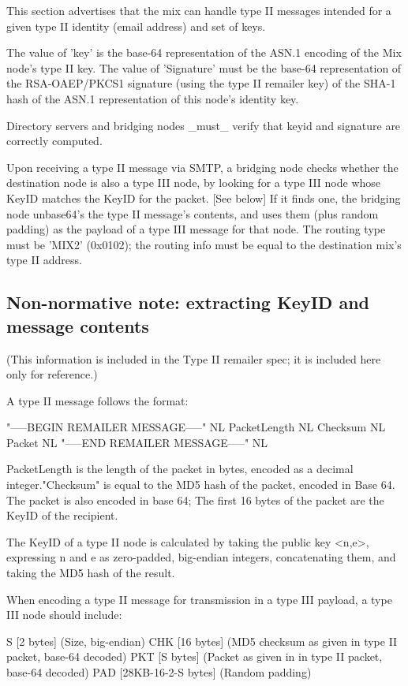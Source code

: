 This section advertises that the mix can handle type II messages
intended for a given type II identity (email address) and set of keys.

The value of 'key' is the base-64 representation of the ASN.1 encoding
of the Mix node's type II key. The value of 'Signature' must be the
base-64 representation of the RSA-OAEP/PKCS1 signature (using the
type II remailer key) of the SHA-1 hash of the ASN.1 representation of
this node's identity key.

Directory servers and bridging nodes _must_ verify that keyid and
signature are correctly computed.

Upon receiving a type II message via SMTP, a bridging node checks
whether the destination node is also a type III node, by looking for a
type III node whose KeyID matches the KeyID for the packet. [See below]
If it finds one, the bridging node unbase64's the type II message's 
contents, and uses them (plus random padding) as the payload
of a type III message for that node.  The routing type must be 'MIX2'
(0x0102); the routing info must be equal to the destination mix's
type II address.

\subsection{Non-normative note: extracting KeyID and message contents}

(This information is included in the Type II remailer spec; it is included
here only for reference.)

A type II message follows the format:

"-----BEGIN REMAILER MESSAGE-----" NL
PacketLength NL
Checksum NL
Packet NL
"-----END REMAILER MESSAGE-----" NL

PacketLength is the length of the packet in bytes, encoded as a
decimal integer."Checksum" is equal to the MD5 hash of the packet,
encoded in Base 64.  The packet is also encoded in base 64; The first
16 bytes of the packet are the KeyID of the recipient.

The KeyID of a type II node is calculated by taking the public key
<n,e>, expressing n and e as zero-padded, big-endian integers,
concatenating them, and taking the MD5 hash of the result.

When encoding a type II message for transmission in a type III payload,
a type III node should include:

S   [2 bytes] (Size, big-endian)
CHK [16 bytes] (MD5 checksum as given in type II packet, base-64 decoded)
PKT [S bytes] (Packet as given in in type II packet, base-64 decoded)
PAD [28KB-16-2-S bytes] (Random padding)

